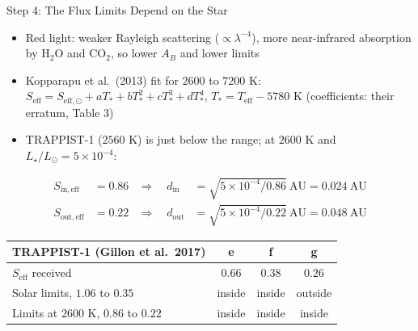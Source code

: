 \documentclass[aspectratio=169, 11pt]{beamer}
\begin{document}
\begin{frame}{Step 4: The Flux Limits Depend on the Star}
  \small
  \begin{itemize}\setlength\itemsep{0pt}\footnotesize
    \item Red light: weaker Rayleigh scattering ($\propto \lambda^{-4}$), more near-infrared absorption by H$_2$O and CO$_2$, so lower $A_B$ and lower limits
    \item Kopparapu et al.\ (2013) fit for $2600$ to $7200$ K: $S_{\mathrm{eff}} = S_{\mathrm{eff},\odot} + aT_* + bT_*^2 + cT_*^3 + dT_*^4$, $T_* = T_{\mathrm{eff}} - 5780$ K (coefficients: their erratum, Table 3)
    \item TRAPPIST-1 ($2560$ K) is just below the range; at $2600$ K and $L_\star/L_\odot = 5 \times 10^{-4}$:
  \end{itemize}
  \[
    \begin{aligned}
      S_{\mathrm{in,eff}} &= 0.86 & \Rightarrow\quad  d_{\mathrm{in}} &= \sqrt{5 \times 10^{-4}/0.86}\ \mathrm{AU} = 0.024\ \mathrm{AU} \\
      S_{\mathrm{out,eff}} &= 0.22 & \Rightarrow\quad  d_{\mathrm{out}} &= \sqrt{5 \times 10^{-4}/0.22}\ \mathrm{AU} = 0.048\ \mathrm{AU}
    \end{aligned}
  \]
  \vskip-3pt
  {\centering\small
    \begin{tabular}{l c c c}
      \toprule
      TRAPPIST-1 (Gillon et al.\ 2017) & e & f & g \\
      \midrule
      $S_{\mathrm{eff}}$ received & $0.66$ & $0.38$ & $0.26$ \\
      Solar limits, $1.06$ to $0.35$ & inside & inside & outside \\
      Limits at $2600$ K, $0.86$ to $0.22$ & inside & inside & inside \\
      \bottomrule
    \end{tabular}
  \par}
\end{frame}
\end{document}
